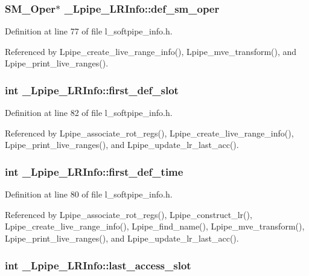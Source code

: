 \subsubsection{\setlength{\rightskip}{0pt plus 5cm}\bf{SM\_\-Oper}$\ast$ \bf{\_\-Lpipe\_\-LRInfo::def\_\-sm\_\-oper}}\label{struct__Lpipe__LRInfo_97f7aeb430c0ee2859209e32335b685d}




Definition at line 77 of file l\_\-softpipe\_\-info.h.

Referenced by Lpipe\_\-create\_\-live\_\-range\_\-info(), Lpipe\_\-mve\_\-transform(), and Lpipe\_\-print\_\-live\_\-ranges().
\subsubsection{\setlength{\rightskip}{0pt plus 5cm}int \bf{\_\-Lpipe\_\-LRInfo::first\_\-def\_\-slot}}\label{struct__Lpipe__LRInfo_90cc1eadc7011d7347fa4ad94f44f97c}




Definition at line 82 of file l\_\-softpipe\_\-info.h.

Referenced by Lpipe\_\-associate\_\-rot\_\-regs(), Lpipe\_\-create\_\-live\_\-range\_\-info(), Lpipe\_\-print\_\-live\_\-ranges(), and Lpipe\_\-update\_\-lr\_\-last\_\-acc().
\subsubsection{\setlength{\rightskip}{0pt plus 5cm}int \bf{\_\-Lpipe\_\-LRInfo::first\_\-def\_\-time}}\label{struct__Lpipe__LRInfo_d635005fcbfec1cd679e74ce08dd34a9}




Definition at line 80 of file l\_\-softpipe\_\-info.h.

Referenced by Lpipe\_\-associate\_\-rot\_\-regs(), Lpipe\_\-construct\_\-lr(), Lpipe\_\-create\_\-live\_\-range\_\-info(), Lpipe\_\-find\_\-name(), Lpipe\_\-mve\_\-transform(), Lpipe\_\-print\_\-live\_\-ranges(), and Lpipe\_\-update\_\-lr\_\-last\_\-acc().
\subsubsection{\setlength{\rightskip}{0pt plus 5cm}int \bf{\_\-Lpipe\_\-LRInfo::last\_\-access\_\-slot}}\label{struct__Lpipe__LRInfo_1d22a7e1e5ddcb61db6db997a7d69b0f}




